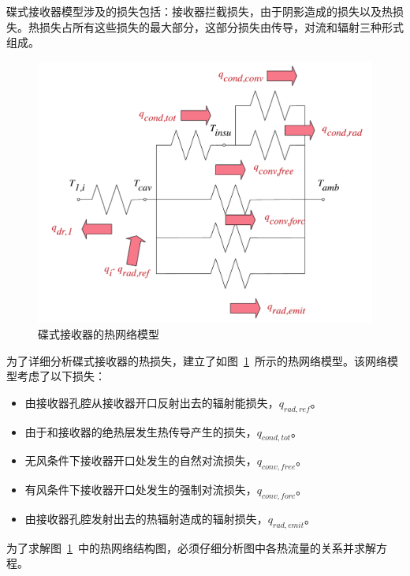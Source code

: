 碟式接收器模型涉及的损失包括：接收器拦截损失，由于阴影造成的损失以及热损失。热损失占所有这些损失的最大部分，这部分损失由传导，对流和辐射三种形式组成。
\begin{figure}[ht!]
	\centering
	\includegraphics[width = 0.5\columnwidth]{fig/thermalLosses.pdf}
	\caption{碟式接收器的热网络模型}
	\label{fig:thermal-lose}
\end{figure}
为了详细分析碟式接收器的热损失，建立了如图~\ref{fig:thermal-lose}~所示的热网络模型。该网络模型考虑了以下损失：
\begin{itemize}
	\item 由接收器孔腔从接收器开口反射出去的辐射能损失，$q_{rad,ref}$。
	\item 由于和接收器的绝热层发生热传导产生的损失，$q_{cond,tot}$。
	\item 无风条件下接收器开口处发生的自然对流损失，$q_{conv,free}$。
	\item 有风条件下接收器开口处发生的强制对流损失，$q_{conv,forc}$。
	\item 由接收器孔腔发射出去的热辐射造成的辐射损失，$q_{rad,emit}$。
\end{itemize}

为了求解图~\ref{fig:thermal-lose}~中的热网络结构图，必须仔细分析图中各热流量的关系并求解方程。

